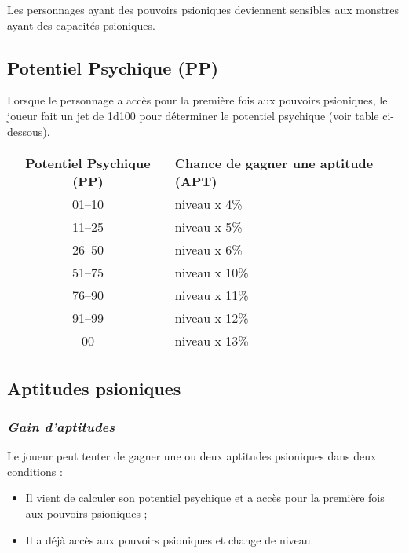 \bigskip

Les personnages ayant des pouvoirs psioniques deviennent sensibles aux monstres ayant des capacités psioniques.

\subsection*{Potentiel Psychique (PP)}

Lorsque le personnage a accès pour la première fois aux pouvoirs psioniques, le joueur fait un jet de 1d100 pour déterminer le potentiel psychique (voir table ci-dessous).
\bigskip

{\parindent3cm\begin{tabular}{cl}
\textbf{Potentiel Psychique (PP)} & \textbf{Chance de gagner une aptitude (APT)} \\
01--10 & niveau x 4\% \\
11--25 & niveau x 5\% \\
26--50 & niveau x 6\% \\
51--75 & niveau x 10\% \\
76--90 & niveau x 11\% \\
91--99 & niveau x 12\% \\
\hspace{0.4cm}00 & niveau x 13\% \\
\end{tabular}}

\subsection*{Aptitudes psioniques}

\subsubsection*{\textit{Gain d'aptitudes}}
\label{aptitudes-gain}

Le joueur peut tenter de gagner une ou deux aptitudes psioniques dans deux conditions :

\bigskip

\begin{itemize}
\item Il vient de calculer son potentiel psychique et a accès pour la première fois aux pouvoirs psioniques ;
\item Il a déjà accès aux pouvoirs psioniques et change de niveau.
\end{itemize}

